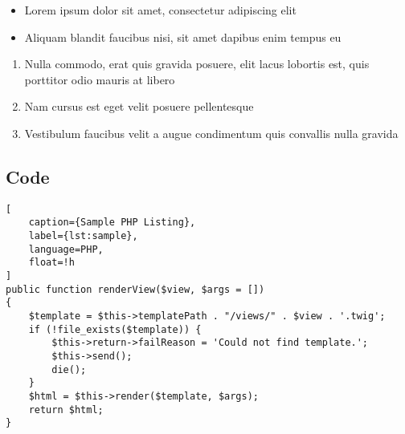 \begin{itemize}
    \item Lorem ipsum dolor sit amet, consectetur adipiscing elit
    \item Aliquam blandit faucibus nisi, sit amet dapibus enim tempus eu
\end{itemize}

\begin{enumerate}
    \item Nulla commodo, erat quis gravida posuere, elit lacus lobortis est, quis porttitor odio mauris at libero
    \item Nam cursus est eget velit posuere pellentesque
    \item Vestibulum faucibus velit a augue condimentum quis convallis nulla gravida
\end{enumerate}

\clearpage


\subsection{Code}

\begin{lstlisting}[
    caption={Sample PHP Listing},
    label={lst:sample},
    language=PHP,
    float=!h
]
public function renderView($view, $args = [])
{
    $template = $this->templatePath . "/views/" . $view . '.twig';
    if (!file_exists($template)) {
        $this->return->failReason = 'Could not find template.';
        $this->send();
        die();
    }
    $html = $this->render($template, $args);
    return $html;
}
\end{lstlisting}

\clearpage